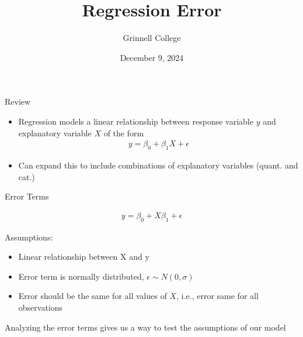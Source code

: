 \documentclass{beamer}
\title[STA 209]{Regression Error}
\subtitle{}
\author{Grinnell College}
\date{December 9, 2024}
\begin{document}
\begin{frame}
  \titlepage
\end{frame}

\begin{frame}{Review}

\begin{itemize}
\item Regression models a linear relationship between response variable $y$ and explanatory variable $X$ of the form
\begin{align*}
y = \beta_0 + \beta_1 X + \epsilon
\end{align*}
\item Can expand this to include combinations of explanatory variables (quant. and cat.)
\end{itemize}

\end{frame}

\begin{frame}{Error Terms}

\begin{align*}
y = \beta_0 + X \beta_1 + \epsilon 
\end{align*} \vspace{4mm}

Assumptions:
\begin{itemize}
\item Linear relationship between X and y
\item Error term is normally distributed, $\epsilon \sim N(0, \sigma)$
\item Error should be the same for all values of $X$, i.e., error same for all observations
\end{itemize} \vspace{4mm}

Analyzing the error terms gives us a way to test the assumptions of our model

\end{frame}
\end{document}

